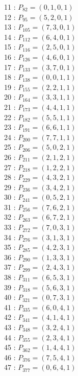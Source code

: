 \documentclass{article}
\begin{document}
{\begin{multicols}{3}
11 : $P_{82}=( 0, 1, 0, 1 )$\\
12 : $P_{95}=( 5, 2, 0, 1 )$\\
13 : $P_{105}=( 7, 3, 0, 1 )$\\
14 : $P_{112}=( 6, 4, 0, 1 )$\\
15 : $P_{116}=( 2, 5, 0, 1 )$\\
16 : $P_{126}=( 4, 6, 0, 1 )$\\
17 : $P_{133}=( 3, 7, 0, 1 )$\\
18 : $P_{138}=( 0, 0, 1, 1 )$\\
19 : $P_{155}=( 2, 2, 1, 1 )$\\
20 : $P_{164}=( 3, 3, 1, 1 )$\\
21 : $P_{173}=( 4, 4, 1, 1 )$\\
22 : $P_{182}=( 5, 5, 1, 1 )$\\
23 : $P_{191}=( 6, 6, 1, 1 )$\\
24 : $P_{200}=( 7, 7, 1, 1 )$\\
25 : $P_{206}=( 5, 0, 2, 1 )$\\
26 : $P_{211}=( 2, 1, 2, 1 )$\\
27 : $P_{218}=( 1, 2, 2, 1 )$\\
28 : $P_{229}=( 4, 3, 2, 1 )$\\
29 : $P_{236}=( 3, 4, 2, 1 )$\\
30 : $P_{241}=( 0, 5, 2, 1 )$\\
31 : $P_{256}=( 7, 6, 2, 1 )$\\
32 : $P_{263}=( 6, 7, 2, 1 )$\\
33 : $P_{272}=( 7, 0, 3, 1 )$\\
34 : $P_{276}=( 3, 1, 3, 1 )$\\
35 : $P_{285}=( 4, 2, 3, 1 )$\\
36 : $P_{290}=( 1, 3, 3, 1 )$\\
37 : $P_{299}=( 2, 4, 3, 1 )$\\
38 : $P_{311}=( 6, 5, 3, 1 )$\\
39 : $P_{318}=( 5, 6, 3, 1 )$\\
40 : $P_{321}=( 0, 7, 3, 1 )$\\
41 : $P_{335}=( 6, 0, 4, 1 )$\\
42 : $P_{341}=( 4, 1, 4, 1 )$\\
43 : $P_{348}=( 3, 2, 4, 1 )$\\
44 : $P_{355}=( 2, 3, 4, 1 )$\\
45 : $P_{362}=( 1, 4, 4, 1 )$\\
46 : $P_{376}=( 7, 5, 4, 1 )$\\
47 : $P_{377}=( 0, 6, 4, 1 )$\\

\end{multicols}}
\end{document}
